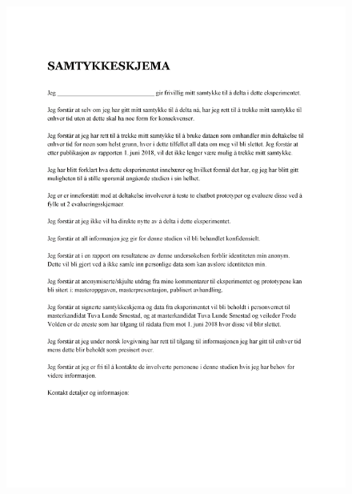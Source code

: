  \begin{figure}
        \centering
        \includegraphics[scale=0.8]{figures/samtykkex1.pdf}
    \end{figure}
